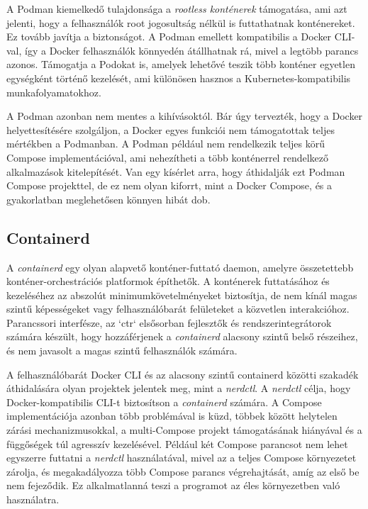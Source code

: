 A Podman kiemelkedő tulajdonsága a \textit{rootless konténerek} támogatása, ami
azt jelenti, hogy a felhasználók root jogosultság nélkül is futtathatnak
konténereket. Ez tovább javítja a biztonságot. A Podman emellett kompatibilis a
Docker CLI-val, így a Docker felhasználók könnyedén átállhatnak rá, mivel a
legtöbb parancs azonos. Támogatja a Podokat is, amelyek lehetővé teszik több
konténer egyetlen egységként történő kezelését, ami különösen hasznos a
Kubernetes-kompatibilis munkafolyamatokhoz.

A Podman azonban nem mentes a kihívásoktól. Bár úgy tervezték, hogy a Docker
helyettesítésére szolgáljon, a Docker egyes funkciói nem támogatottak teljes
mértékben a Podmanban. A Podman például nem rendelkezik teljes körű Compose
implementációval, ami nehezítheti a több konténerrel rendelkező alkalmazások
kitelepítését. Van egy kísérlet arra, hogy áthidalják ezt Podman Compose
projekttel, de ez nem olyan kiforrt, mint a Docker Compose, és a gyakorlatban
meglehetősen könnyen hibát dob. \cite{ezeobi2024investigation}

\subsection{Containerd}

A \textit{containerd} egy olyan alapvető konténer-futtató daemon, amelyre
összetettebb konténer-orchestrációs platformok építhetők. A konténerek
futtatásához és kezeléséhez az abszolút minimumkövetelményeket biztosítja, de
nem kínál magas szintű képességeket vagy felhasználóbarát felületeket a
közvetlen interakcióhoz. Parancssori interfésze, az `ctr` elsősorban fejlesztők
és rendszerintegrátorok számára készült, hogy hozzáférjenek a
\textit{containerd} alacsony szintű belső részeihez, és nem javasolt a magas
szintű felhasználók számára.

A felhasználóbarát Docker CLI és az alacsony szintű containerd közötti szakadék
áthidalására olyan projektek jelentek meg, mint a \textit{nerdctl}. A
\textit{nerdctl} célja, hogy Docker-kompatibilis CLI-t biztosítson a
\textit{containerd} számára. A Compose implementációja azonban több problémával
is küzd, többek között helytelen zárási mechanizmusokkal, a multi-Compose
projekt támogatásának hiányával és a függőségek túl agresszív kezelésével.
Például két Compose parancsot nem lehet egyszerre futtatni a \textit{nerdctl}
használatával, mivel az a teljes Compose környezetet zárolja, és megakadályozza
több Compose parancs végrehajtását, amíg az első be nem fejeződik. Ez
alkalmatlanná teszi a programot az éles környezetben való használatra.

